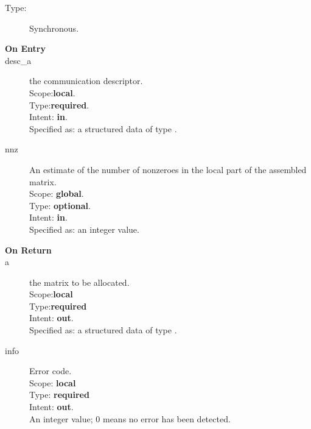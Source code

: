 


%
%


\begin{description}
\item[Type:] Synchronous.
\item[\bf On Entry]
\item[desc\_a] the communication descriptor.\\
Scope:{\bf local}.\\
Type:{\bf required}.\\
Intent: {\bf in}.\\
Specified as: a structured data of type \descdata.
\item[nnz] An estimate of the number of nonzeroes in the local
  part of the assembled matrix.\\ 
Scope: {\bf global}.\\
Type: {\bf optional}.\\
Intent: {\bf in}.\\
Specified as: an integer value. 
\end{description}

\begin{description}
\item[\bf On Return]
\item[a] the matrix to be allocated.\\
Scope:{\bf local}\\
Type:{\bf required}\\
Intent: {\bf out}.\\
Specified as: a structured data of type \spdata.
\item[info] Error code.\\
Scope: {\bf local} \\
Type: {\bf required} \\
Intent: {\bf out}.\\
An integer value; 0 means no error has been detected. 
\end{description}
